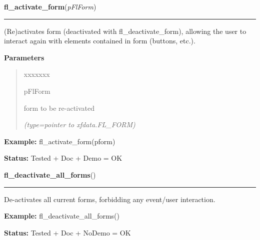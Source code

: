\hspace{.8\funcindent}\begin{boxedminipage}{\funcwidth}

    \raggedright \textbf{fl\_activate\_form}(\textit{pFlForm})

    \vspace{-1.5ex}

    \rule{\textwidth}{0.5\fboxrule}
\setlength{\parskip}{2ex}
    (Re)activates form (deactivated with fl\_deactivate\_form), allowing 
    the user to interact again with elements contained in form (buttons, 
    etc.).

\setlength{\parskip}{1ex}
      \textbf{Parameters}
      \vspace{-1ex}

      \begin{quote}
        \begin{Ventry}{xxxxxxx}

          \item[pFlForm]

          form to be re-activated

            {\it (type=pointer to xfdata.FL\_FORM)}

        \end{Ventry}

      \end{quote}

\textbf{Example:} fl\_activate\_form(pform)



\textbf{Status:} Tested + Doc + Demo = OK



    \end{boxedminipage}

    \label{xformslib:flbasic:fl_deactivate_all_forms}

    \vspace{0.5ex}

\hspace{.8\funcindent}\begin{boxedminipage}{\funcwidth}

    \raggedright \textbf{fl\_deactivate\_all\_forms}()

    \vspace{-1.5ex}

    \rule{\textwidth}{0.5\fboxrule}
\setlength{\parskip}{2ex}
    De-activates all current forms, forbidding any event/user interaction.

\setlength{\parskip}{1ex}
\textbf{Example:} fl\_deactivate\_all\_forms()



\textbf{Status:} Tested + Doc + NoDemo = OK



    \end{boxedminipage}

